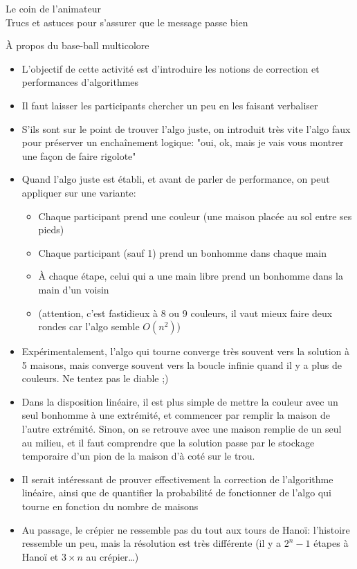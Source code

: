\documentclass[final,hyperref={pdfpagelabels=false}]{beamer}
\renewcommand*{\large}{\fontsize{\resultlargeX}{\resultlargeY}\selectfont}
\begin{document}
\begin{frame}{Le coin de l'animateur\\[-5pt]
  {\large Trucs et astuces pour s'assurer que le message passe bien}}
  \begin{block}{À propos du base-ball multicolore}
    \begin{itemize}
    \item L'objectif de cette activité est d'introduire les notions de
      correction et performances d'algorithmes
    \item Il faut laisser les participants chercher un peu en les faisant verbaliser
    \item S'ils sont sur le point de trouver l'algo juste, on introduit très
      vite l'algo faux pour préserver un enchaînement logique: "oui, ok, mais
      je vais vous montrer une façon de faire rigolote"
    \item Quand l'algo juste est établi, et avant de parler de performance, on
      peut appliquer sur une variante:\vspace{-\baselineskip}
      \begin{itemize}
      \item Chaque participant prend une couleur (une maison placée au sol entre ses pieds)
      \item Chaque participant (sauf 1) prend un bonhomme dans chaque main
      \item À chaque étape, celui qui a une main libre prend un bonhomme dans la main d'un voisin
      \item (attention, c'est fastidieux à 8 ou 9 couleurs, il vaut mieux faire
        deux rondes car l'algo semble $O(n^2)$)
      \end{itemize}
    \item Expérimentalement, l'algo qui tourne converge très souvent vers la
      solution à 5 maisons, mais converge souvent vers la boucle infinie quand
      il y a plus de couleurs. Ne tentez pas le diable ;)
    \item Dans la disposition linéaire, il est plus simple de mettre la couleur
      avec un seul bonhomme à une extrémité, et commencer par remplir la maison
      de l'autre extrémité. Sinon, on se retrouve avec une maison remplie de un
      seul au milieu, et il faut comprendre que la solution passe par le
      stockage temporaire d'un pion de la maison d'à coté sur le trou.
    \item Il serait intéressant de prouver effectivement la correction de
      l'algorithme linéaire, ainsi que de quantifier la probabilité de
      fonctionner de l'algo qui tourne en fonction du nombre de maisons
    \item Au passage, le crépier ne ressemble pas du tout aux tours de Hanoï:
      l'histoire ressemble un peu, mais la résolution est très différente (il y
      a $2^n-1$ étapes à Hanoï et $3\times n$ au crépier\ldots)
    \end{itemize}
  \end{block}
\end{frame}
\end{document}
